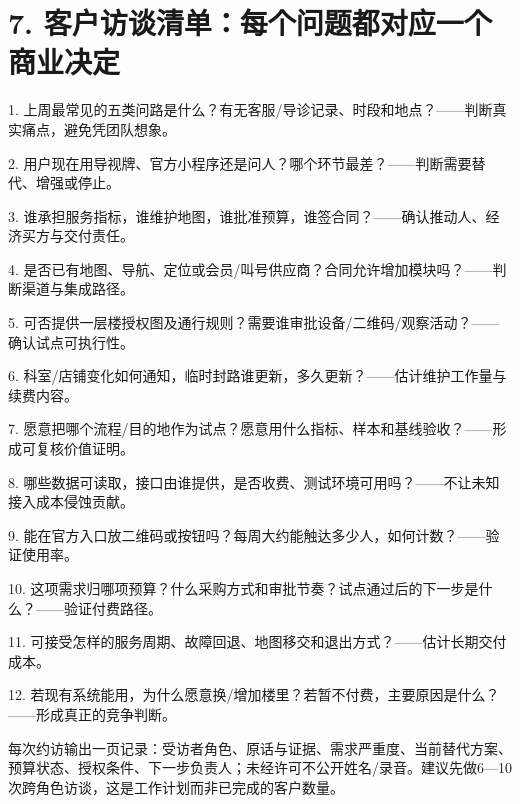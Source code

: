 \documentclass[UTF8,10pt,fontset=fandol]{ctexart}
\begin{document}
\section*{7. 客户访谈清单：每个问题都对应一个商业决定}
1. 上周最常见的五类问路是什么？有无客服/导诊记录、时段和地点？——判断真实痛点，避免凭团队想象。\par
2. 用户现在用导视牌、官方小程序还是问人？哪个环节最差？——判断需要替代、增强或停止。\par
3. 谁承担服务指标，谁维护地图，谁批准预算，谁签合同？——确认推动人、经济买方与交付责任。\par
4. 是否已有地图、导航、定位或会员/叫号供应商？合同允许增加模块吗？——判断渠道与集成路径。\par
5. 可否提供一层楼授权图及通行规则？需要谁审批设备/二维码/观察活动？——确认试点可执行性。\par
6. 科室/店铺变化如何通知，临时封路谁更新，多久更新？——估计维护工作量与续费内容。\par
7. 愿意把哪个流程/目的地作为试点？愿意用什么指标、样本和基线验收？——形成可复核价值证明。\par
8. 哪些数据可读取，接口由谁提供，是否收费、测试环境可用吗？——不让未知接入成本侵蚀贡献。\par
9. 能在官方入口放二维码或按钮吗？每周大约能触达多少人，如何计数？——验证使用率。\par
10. 这项需求归哪项预算？什么采购方式和审批节奏？试点通过后的下一步是什么？——验证付费路径。\par
11. 可接受怎样的服务周期、故障回退、地图移交和退出方式？——估计长期交付成本。\par
12. 若现有系统能用，为什么愿意换/增加楼里？若暂不付费，主要原因是什么？——形成真正的竞争判断。\par
每次约访输出一页记录：受访者角色、原话与证据、需求严重度、当前替代方案、预算状态、授权条件、下一步负责人；未经许可不公开姓名/录音。建议先做6—10次跨角色访谈，这是工作计划而非已完成的客户数量。\par
\end{document}
